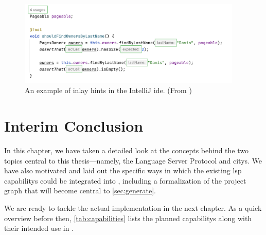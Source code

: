 \documentclass[../thesis]{subfiles}
\begin{document}
\begin{figure}
	\begin{center}
		\includegraphics[width=0.95\textwidth]{figures/inlay_hints_example}
	\end{center}
	\caption{An example of inlay hints in the IntelliJ \gls{ide}. (From )}\label{fig:inlay}
\end{figure}


\section{Interim Conclusion}
In this chapter, we have taken a detailed look at the concepts behind the two topics central to this thesis---namely, the {Language Server Protocol} and \glspl{city}.
We have also motivated and laid out the specific ways in which the existing \gls{lsp} \glspl{capability} could be integrated into \SEE{}, including a formalization of the project graph that will become central to \cref{sec:generate}.

We are ready to tackle the actual implementation in the next chapter.
As a quick overview before then, \cref{tab:capabilities} lists the planned \glspl{capability} along with their intended use in \SEE{}.
\end{document}
